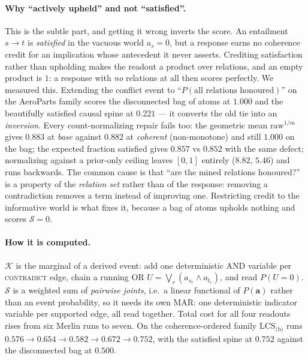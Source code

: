 \documentclass[11pt]{article}
\begin{document}
\paragraph{Why ``actively upheld'' and not ``satisfied''.} This is the subtle part, and
getting it wrong inverts the score. An entailment $s\to t$ is \emph{satisfied} in the vacuous
world $a_s{=}0$, but a response earns no coherence credit for an implication whose antecedent
it never asserts. Crediting satisfaction rather than upholding makes the readout a product
over relations, and an empty product is $1$: a response with \emph{no} relations at all then
scores perfectly. We measured this. Extending the conflict event to ``$P(\text{all relations
honoured})$'' on the AeroParts family scores the disconnected bag of atoms at $1.000$ and the
beautifully satisfied causal spine at $0.221$ --- it converts the old tie into an
\emph{inversion}. Every count-normalizing repair fails too: the geometric mean $\mathrm{raw}^{1/m}$
gives $0.883$ at \emph{base} against $0.882$ at \emph{coherent} (non-monotone) and still
$1.000$ on the bag; the expected fraction satisfied gives $0.857$ vs $0.852$ with the same
defect; normalizing against a prior-only ceiling leaves $[0,1]$ entirely ($8.82$, $5.46$) and
runs backwards. The common cause is that ``are the mined relations honoured?'' is a property
of the \emph{relation set} rather than of the response: removing a contradiction removes a
term instead of improving one. Restricting credit to the informative world is what fixes it,
because a bag of atoms upholds nothing and scores $\mathcal S{=}0$.

\paragraph{How it is computed.} $\mathcal K$ is the marginal of a derived event: add one
deterministic AND variable per \textsc{contradict} edge, chain a running OR
$U=\bigvee_r (a_{s_r}\wedge a_{t_r})$, and read $P(U{=}0)$. $\mathcal S$ is a weighted sum of
\emph{pairwise joints}, i.e.\ a linear functional of $P(\mathbf a)$ rather than an event
probability, so it needs its own MAR: one deterministic indicator variable per supported edge,
all read together. Total cost for all four readouts rises from six Merlin runs to seven. On
the coherence-ordered family $\mathrm{LCS}_{\text{(b)}}$ runs
$0.576\to0.654\to\mathbf{0.582}\to0.672\to0.752$, with the satisfied spine at $0.752$ against
the disconnected bag at $0.500$.
\end{document}
